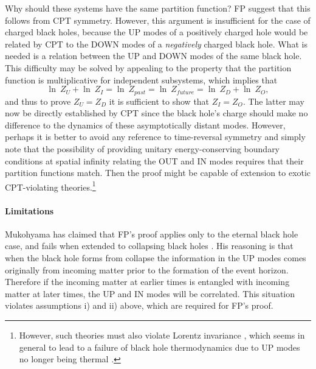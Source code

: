 \documentclass[12pt]{article}
\begin{document}
Why should these systems have the same partition function?  FP suggest that this follows from CPT symmetry.  However, this argument is insufficient for the case of charged black holes, because the UP modes of a positively charged hole would be related by CPT to the DOWN modes of a \emph{negatively} charged black hole.  What is needed is a relation between the UP and DOWN modes of the same black hole.  This difficulty may be solved by appealing to the property that the partition function is multiplicative for independent subsystems, which implies that
\begin{equation}
\ln \:Z_{U} + \ln \:Z_{I} = \ln \:Z_{past} = \ln \:Z_{future} = \ln \:Z_{D} + \ln \:Z_{O},
\end{equation}
and thus to prove $Z_{U} = Z_{D}$ it is sufficient to show that $Z_{I} = Z_{O}$.  The latter may now be directly established by CPT since the black hole's charge should make no difference to the dynamics of these asymptotically distant modes.  However, perhaps it is better to avoid any reference to time-reversal symmetry and simply note that the possibility of providing unitary energy-conserving boundary conditions at spatial infinity relating the OUT and IN modes requires that their partition functions match.  Then the proof might be capable of extension to exotic CPT-violating theories.\footnote{However, such theories must also violate Lorentz invariance \cite{greenberg06}, which seems in general to lead to a failure of black hole thermodynamics due to UP modes no longer being thermal \cite{EFJW07}.}

\paragraph{Limitations}

Mukohyama has claimed that FP's proof applies only to the eternal black hole case, and fails when extended to collapsing black holes \cite{muko97}.  His reasoning is that when the black hole forms from collapse the information in the UP modes comes originally from incoming matter prior to the formation of the event horizon.  Therefore if the incoming matter at earlier times is entangled with incoming matter at later times, the UP and IN modes will be correlated.  This situation violates assumptions i) and ii) above, which are required for FP's proof.
\end{document}
